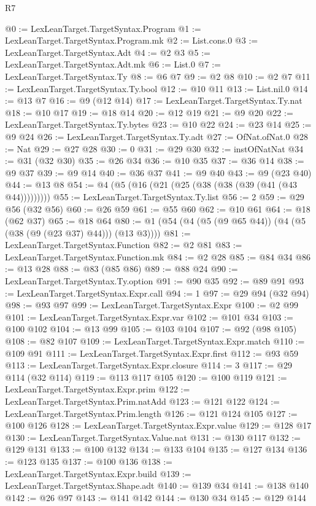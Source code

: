 \begin{lexlean}{R7}
\begin{coremodule}
@0 := LexLeanTarget.TargetSyntax.Program
@1 := LexLeanTarget.TargetSyntax.Program.mk
@2 := List.cons.{0}
@3 := LexLeanTarget.TargetSyntax.Adt
@4 := @2 @3
@5 := LexLeanTarget.TargetSyntax.Adt.mk
@6 := List.{0}
@7 := LexLeanTarget.TargetSyntax.Ty
@8 := @6 @7
@9 := @2 @8
@10 := @2 @7
@11 := LexLeanTarget.TargetSyntax.Ty.bool
@12 := @10 @11
@13 := List.nil.{0}
@14 := @13 @7
@16 := @9 (@12 @14)
@17 := LexLeanTarget.TargetSyntax.Ty.nat
@18 := @10 @17
@19 := @18 @14
@20 := @12 @19
@21 := @9 @20
@22 := LexLeanTarget.TargetSyntax.Ty.bytes
@23 := @10 @22
@24 := @23 @14
@25 := @9 @24
@26 := LexLeanTarget.TargetSyntax.Ty.adt
@27 := OfNat.ofNat.{0}
@28 := Nat
@29 := @27 @28
@30 := 0
@31 := @29 @30
@32 := instOfNatNat
@34 := @31 (@32 @30)
@35 := @26 @34
@36 := @10 @35
@37 := @36 @14
@38 := @9 @37
@39 := @9 @14
@40 := @36 @37
@41 := @9 @40
@43 := @9 (@23 @40)
@44 := @13 @8
@54 := @4 (@5 (@16 (@21 (@25 (@38 (@38 (@39 (@41 (@43 @44)))))))))
@55 := LexLeanTarget.TargetSyntax.Ty.list
@56 := 2
@59 := @29 @56 (@32 @56)
@60 := @26 @59
@61 := @55 @60
@62 := @10 @61
@64 := @18 (@62 @37)
@65 := @18 @64
@80 := @1 (@54 (@4 (@5 (@9 @65 @44)) (@4 (@5 (@38 (@9 (@23 @37) @44))) (@13 @3))))
@81 := LexLeanTarget.TargetSyntax.Function
@82 := @2 @81
@83 := LexLeanTarget.TargetSyntax.Function.mk
@84 := @2 @28
@85 := @84 @34
@86 := @13 @28
@88 := @83 (@85 @86)
@89 := @88 @24
@90 := LexLeanTarget.TargetSyntax.Ty.option
@91 := @90 @35
@92 := @89 @91
@93 := LexLeanTarget.TargetSyntax.Expr.call
@94 := 1
@97 := @29 @94 (@32 @94)
@98 := @93 @97
@99 := LexLeanTarget.TargetSyntax.Expr
@100 := @2 @99
@101 := LexLeanTarget.TargetSyntax.Expr.var
@102 := @101 @34
@103 := @100 @102
@104 := @13 @99
@105 := @103 @104
@107 := @92 (@98 @105)
@108 := @82 @107
@109 := LexLeanTarget.TargetSyntax.Expr.match
@110 := @109 @91
@111 := LexLeanTarget.TargetSyntax.Expr.first
@112 := @93 @59
@113 := LexLeanTarget.TargetSyntax.Expr.closure
@114 := 3
@117 := @29 @114 (@32 @114)
@119 := @113 @117 @105
@120 := @100 @119
@121 := LexLeanTarget.TargetSyntax.Expr.prim
@122 := LexLeanTarget.TargetSyntax.Prim.natAdd
@123 := @121 @122
@124 := LexLeanTarget.TargetSyntax.Prim.length
@126 := @121 @124 @105
@127 := @100 @126
@128 := LexLeanTarget.TargetSyntax.Expr.value
@129 := @128 @17
@130 := LexLeanTarget.TargetSyntax.Value.nat
@131 := @130 @117
@132 := @129 @131
@133 := @100 @132
@134 := @133 @104
@135 := @127 @134
@136 := @123 @135
@137 := @100 @136
@138 := LexLeanTarget.TargetSyntax.Expr.build
@139 := LexLeanTarget.TargetSyntax.Shape.adt
@140 := @139 @34
@141 := @138 @140
@142 := @26 @97
@143 := @141 @142
@144 := @130 @34
@145 := @129 @144

\end{coremodule}
\end{lexlean}
